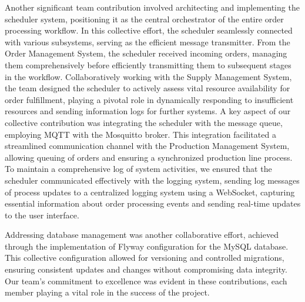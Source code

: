 \documentclass[conference, onecolumn]{IEEEtran}
\begin{document}
Another significant team contribution involved architecting and implementing the scheduler system, positioning it as the central orchestrator of the entire order processing workflow. In this collective effort, the scheduler seamlessly connected with various subsystems, serving as the efficient message transmitter. From the Order Management System, the scheduler received incoming orders, managing them comprehensively before efficiently transmitting them to subsequent stages in the workflow. Collaboratively working with the Supply Management System, the team designed the scheduler to actively assess vital resource availability for order fulfillment, playing a pivotal role in dynamically responding to insufficient resources and sending information logs for further systems. A key aspect of our collective contribution was integrating the scheduler with the message queue, employing MQTT with the Mosquitto broker. This integration facilitated a streamlined communication channel with the Production Management System, allowing queuing of orders and ensuring a synchronized production line process. To maintain a comprehensive log of system activities, we ensured that the scheduler communicated effectively with the logging system, sending log messages of process updates to a centralized logging system using a WebSocket, capturing essential information about order processing events and sending real-time updates to the user interface.

Addressing database management was another collaborative effort, achieved through the implementation of Flyway configuration for the MySQL database. This collective configuration allowed for versioning and controlled migrations, ensuring consistent updates and changes without compromising data integrity. Our team's commitment to excellence was evident in these contributions, each member playing a vital role in the success of the project.
\end{document}
